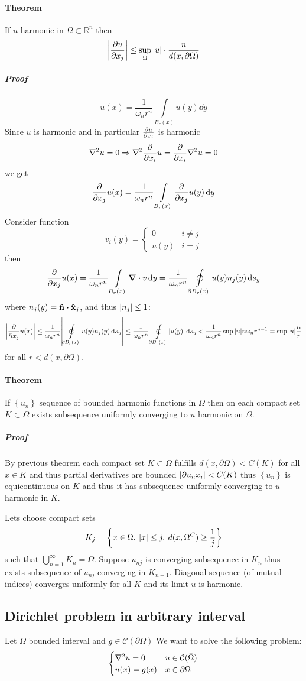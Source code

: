\paragraph{Theorem} If $u$ harmonic in $\Omega \subset \mathbb{R}^n$ then
$$\abs{\pdv{u}{x_j} (x)} \leq \sup\limits_{\Omega} \abs{u} \cdot \frac{n}{d(x, \partial \Omega)}$$
\subparagraph{Proof}
$$u(x) = \frac{1}{\omega_n r^n} \int\limits_{B_r(x)} u(y) \dd{y}$$
Since $u$ is harmonic and in particular $\pdv{u}{x_i}$ is harmonic
$$\laplacian{u} = 0 \Rightarrow \laplacian{\pdv{x_i} u} = \pdv{x_i} \laplacian{u} = 0$$
we get
$$\pdv{x_j} u(x) =  \frac{1}{\omega_n r^n} \int\limits_{B_r(x)} \pdv{x_j} u(y) \dd{y}$$
Consider function
$$v_i(y) = \begin{cases}
0 & i\neq j\\
u(y) & i=j
\end{cases}$$
then
$$\pdv{x_j} u(x) =  \frac{1}{\omega_n r^n} \int\limits_{B_r(x)} \div{v} \dd{y} =  \frac{1}{\omega_n r^n} \oint\limits_{ \partial B_r(x)} u(y) n_j(y) \dd{s_y}$$
where $n_j(y) = \vu{n} \vdot \vu{x}_j$, and thus $\abs{n_j} \leq 1$:
$$\abs{\pdv{x_j} u(x) } \leq \frac{1}{\omega_n r^n} \abs{\oint\limits_{ \partial B_r(x)} u(y) n_j(y) \dd{s_y}} \leq \frac{1}{\omega_n r^n} \oint\limits_{ \partial B_r(x)} \abs{u(y)}  \dd{s_y} < \frac{1}{\omega_n r^n} \sup \abs{u} n\omega_n r^{n-1} = \sup \abs{u} \frac{n}{r}$$
for all $r< d(x, \partial \Omega)$.
\paragraph{Theorem}
If $\left\{ u_n \right\}$ sequence of bounded harmonic functions in $\Omega$ then on each compact set $K\subset \Omega$ exists subsequence  uniformly converging to $u$ harmonic on $\Omega$.
\subparagraph{Proof}
 By previous theorem each compact set $K\subset \Omega$ fulfills  $d(x, \partial \Omega) < C(K)$ for all $x\in K$ and thus partial derivatives are bounded $\abs{\partial{u_n}{x_i}} < C(K)$ thus $\left\{u_n\right\}$ is equicontinuous on $K$ and thus it has subsequence  uniformly converging to $u$ harmonic in $K$.


Lets choose compact sets
$$K_j = \left\{ x\in \Omega, \: \abs{x} \leq j, \: d(x, \Omega^C) \geq \frac{1}{j} \right\}$$
such that $\bigcup_{n=1}^\infty K_n = \Omega$. Suppose $u_{nj}$ is converging subsequence in $K_n$ thus exists subsequence of $u_{nj}$ converging in $K_{n+1}$. Diagonal sequence (of mutual indices) converges uniformly for all $K$ and its limit $u$ is harmonic.
\subsection{Dirichlet problem in arbitrary interval}
Let $\Omega$ bounded interval and $g\in \mathcal{C}(\partial \Omega)$ We want to solve the following problem:
$$\begin{cases}
\laplacian{u} = 0 & u \in \mathcal{C}(\bar{\Omega})\\
u(x) = g(x) & x \in \partial \Omega
\end{cases}$$
